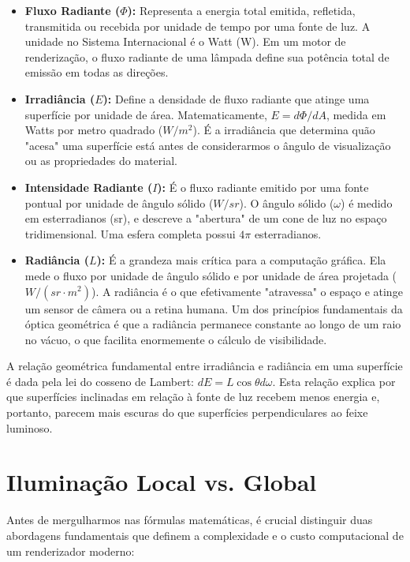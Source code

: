 \begin{itemize}
    \item \textbf{Fluxo Radiante ($\Phi$):} Representa a energia total emitida, refletida, transmitida ou recebida por unidade de tempo por uma fonte de luz. A unidade no Sistema Internacional é o Watt (W). Em um motor de renderização, o fluxo radiante de uma lâmpada define sua potência total de emissão em todas as direções.
    \item \textbf{Irradiância ($E$):} Define a densidade de fluxo radiante que atinge uma superfície por unidade de área. Matematicamente, $E = d\Phi / dA$, medida em Watts por metro quadrado ($W/m^2$). É a irradiância que determina quão "acesa" uma superfície está antes de considerarmos o ângulo de visualização ou as propriedades do material.
    \item \textbf{Intensidade Radiante ($I$):} É o fluxo radiante emitido por uma fonte pontual por unidade de ângulo sólido ($W/sr$). O ângulo sólido ($\omega$) é medido em esterradianos (sr), e descreve a "abertura" de um cone de luz no espaço tridimensional. Uma esfera completa possui $4\pi$ esterradianos.
    \item \textbf{Radiância ($L$):} É a grandeza mais crítica para a computação gráfica. Ela mede o fluxo por unidade de ângulo sólido e por unidade de área projetada ($W/(sr \cdot m^2)$). A radiância é o que efetivamente "atravessa" o espaço e atinge um sensor de câmera ou a retina humana. Um dos princípios fundamentais da óptica geométrica é que a radiância permanece constante ao longo de um raio no vácuo, o que facilita enormemente o cálculo de visibilidade.
\end{itemize}

A relação geométrica fundamental entre irradiância e radiância em uma superfície é dada pela lei do cosseno de Lambert: $dE = L \cos\theta d\omega$. Esta relação explica por que superfícies inclinadas em relação à fonte de luz recebem menos energia e, portanto, parecem mais escuras do que superfícies perpendiculares ao feixe luminoso.

\section{Iluminação Local vs. Global}

Antes de mergulharmos nas fórmulas matemáticas, é crucial distinguir duas abordagens fundamentais que definem a complexidade e o custo computacional de um renderizador moderno:

